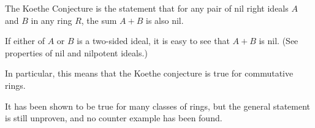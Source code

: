 \documentclass[12pt]{article}
\begin{document}
The Koethe Conjecture is the statement that for any pair of nil right ideals $A$ and $B$ in any ring $R$, the sum $A + B$ is also nil.

If either of $A$ or $B$ is a two-sided ideal, it is easy to see that $A + B$ is nil.  (See properties of nil and nilpotent ideals.)

In particular, this means that the  Koethe conjecture is true for commutative rings.

It has been shown to be true for many classes of rings, but the general statement is still unproven, and no counter example has been found.
\end{document}
